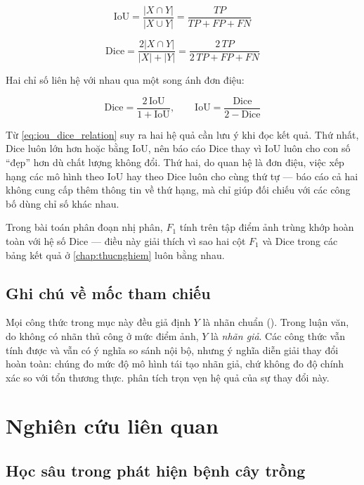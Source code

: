 \begin{equation}
    \text{IoU} = \frac{|X \cap Y|}{|X \cup Y|} = \frac{TP}{TP + FP + FN}
    \label{eq:iou}
\end{equation}

\begin{equation}
    \text{Dice} = \frac{2|X \cap Y|}{|X| + |Y|} = \frac{2\,TP}{2\,TP + FP + FN}
    \label{eq:dicecoef}
\end{equation}

Hai chỉ số liên hệ với nhau qua một song ánh đơn điệu:

\begin{equation}
    \text{Dice} = \frac{2\,\text{IoU}}{1 + \text{IoU}}, \qquad
    \text{IoU} = \frac{\text{Dice}}{2 - \text{Dice}}
    \label{eq:iou_dice_relation}
\end{equation}

Từ \cref{eq:iou_dice_relation} suy ra hai hệ quả cần lưu ý khi đọc kết quả. Thứ
nhất, Dice luôn lớn hơn hoặc bằng IoU, nên báo cáo Dice thay vì IoU luôn cho con
số ``đẹp'' hơn dù chất lượng không đổi. Thứ hai, do quan hệ là đơn điệu, việc xếp
hạng các mô hình theo IoU hay theo Dice luôn cho cùng thứ tự --- báo cáo cả hai
không cung cấp thêm thông tin về thứ hạng, mà chỉ giúp đối chiếu với các công bố
dùng chỉ số khác nhau.

Trong bài toán phân đoạn nhị phân, $F_1$ tính trên tập điểm ảnh trùng khớp hoàn
toàn với hệ số Dice --- điều này giải thích vì sao hai cột $F_1$ và Dice trong
các bảng kết quả ở \cref{chap:thucnghiem} luôn bằng nhau.

\subsection{Ghi chú về mốc tham chiếu}

Mọi công thức trong mục này đều giả định $Y$ là nhãn chuẩn ().
Trong luận văn, do không có nhãn thủ công ở mức điểm ảnh, $Y$ là \emph{nhãn giả}.
Các công thức vẫn tính được và vẫn có ý nghĩa so sánh nội bộ, nhưng ý nghĩa diễn
giải thay đổi hoàn toàn: chúng đo mức độ mô hình tái tạo nhãn giả, chứ không đo
độ chính xác so với tổn thương thực.  phân tích trọn vẹn hệ quả
của sự thay đổi này.

\section{Nghiên cứu liên quan}
\label{sec:lienquan}

\subsection{Học sâu trong phát hiện bệnh cây trồng}


